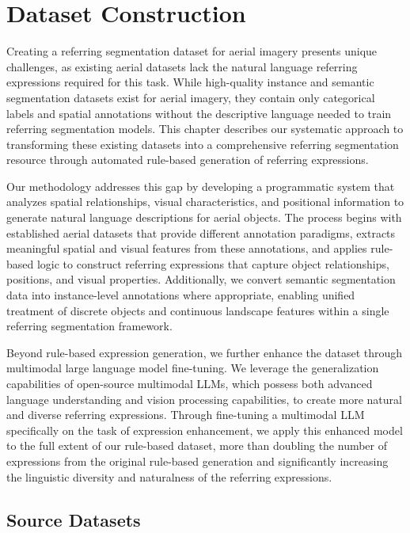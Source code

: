 \section{Dataset Construction}

Creating a referring segmentation dataset for aerial imagery presents unique challenges, as existing aerial datasets lack the natural language referring expressions required for this task. While high-quality instance and semantic segmentation datasets exist for aerial imagery, they contain only categorical labels and spatial annotations without the descriptive language needed to train referring segmentation models. This chapter describes our systematic approach to transforming these existing datasets into a comprehensive referring segmentation resource through automated rule-based generation of referring expressions.

Our methodology addresses this gap by developing a programmatic system that analyzes spatial relationships, visual characteristics, and positional information to generate natural language descriptions for aerial objects. The process begins with established aerial datasets that provide different annotation paradigms, extracts meaningful spatial and visual features from these annotations, and applies rule-based logic to construct referring expressions that capture object relationships, positions, and visual properties. Additionally, we convert semantic segmentation data into instance-level annotations where appropriate, enabling unified treatment of discrete objects and continuous landscape features within a single referring segmentation framework.

Beyond rule-based expression generation, we further enhance the dataset through multimodal large language model fine-tuning. We leverage the generalization capabilities of open-source multimodal LLMs, which possess both advanced language understanding and vision processing capabilities, to create more natural and diverse referring expressions. Through fine-tuning a multimodal LLM specifically on the task of expression enhancement, we apply this enhanced model to the full extent of our rule-based dataset, more than doubling the number of expressions from the original rule-based generation and significantly increasing the linguistic diversity and naturalness of the referring expressions.

\subsection{Source Datasets}


